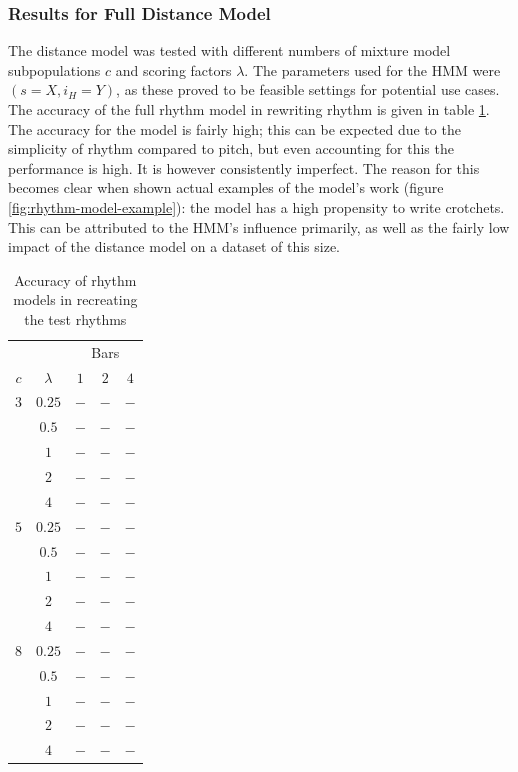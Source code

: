 \documentclass[ author={Stephen Livermore-Tozer},
				supervisor={Dr. Peter Flach},
				degree={MEng},
				title={Algorithmic Co-composition Using Machine Learning},
				subtitle={},
				type={research},
				year={2016} ]{dissertation}
\begin{document}
	\subsubsection{Results for Full Distance Model}
	
	The distance model was tested with different numbers of mixture model subpopulations $c$ and scoring factors $\lambda$. The parameters used for the HMM were $(s = X, i_H = Y)$, as these proved to be feasible settings for potential use cases. The accuracy of the full rhythm model in rewriting rhythm is given in table \ref{tab:rhythm-model-results}. The accuracy for the model is fairly high; this can be expected due to the simplicity of rhythm compared to pitch, but even accounting for this the performance is high. It is however consistently imperfect. The reason for this becomes clear when shown actual examples of the model's work (figure \ref{fig:rhythm-model-example}): the model has a high propensity to write crotchets. This can be attributed to the HMM's influence primarily, as well as the fairly low impact of the distance model on a dataset of this size. 
	
	\begin{table}[htp]
		\begin{center}
			\begin{tabular}{ccccc}
				\toprule
				& & \multicolumn{3}{c}{Bars}\\
				\cline{3-5}
				$c$ & $\lambda$ & $1$ & $2$ & $4$\\
				\hline
				$3$ & $0.25$ & $-$ & $-$ & $-$\\
				& $0.5$      & $-$ & $-$ & $-$\\
				& $1$        & $-$ & $-$ & $-$\\
				& $2$        & $-$ & $-$ & $-$\\
				& $4$        & $-$ & $-$ & $-$\\
				$5$ & $0.25$ & $-$ & $-$ & $-$\\
				& $0.5$      & $-$ & $-$ & $-$\\
				& $1$        & $-$ & $-$ & $-$\\
				& $2$        & $-$ & $-$ & $-$\\
				& $4$        & $-$ & $-$ & $-$\\
				$8$ & $0.25$ & $-$ & $-$ & $-$\\
				& $0.5$      & $-$ & $-$ & $-$\\
				& $1$        & $-$ & $-$ & $-$\\
				& $2$        & $-$ & $-$ & $-$\\
				& $4$        & $-$ & $-$ & $-$\\
				\bottomrule
			\end{tabular}
		\end{center}
		\caption{Accuracy of rhythm models in recreating the test rhythms}
		\label{tab:rhythm-model-results}
	\end{table}
	
\end{document}

